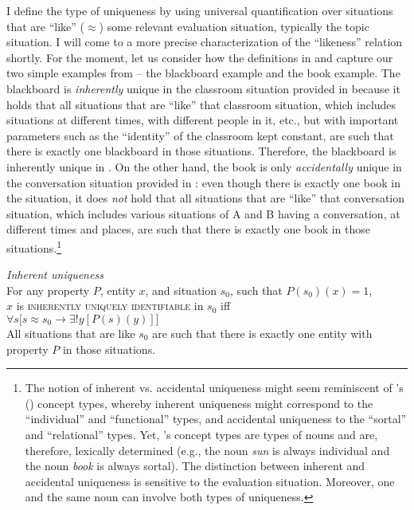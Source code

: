 \documentclass[output=paper,colorlinks,citecolor=brown,newtxmath]{langscibook}
\begin{document}
I define the type of uniqueness by using universal quantification over situations that are ``like'' ($\approx$) some relevant evaluation situation, typically the topic situation. I will come to a more precise characterization of the ``likeness'' relation shortly. For the moment, let us consider how the definitions in  and  capture our two simple examples from  -- the blackboard example and the book example. The blackboard is \textit{inherently} unique in the classroom situation provided in  because it holds that all situations that are ``like'' that classroom situation, which includes situations at different times, with different people in it, etc., but with important parameters such as the ``identity'' of the classroom kept constant, are such that there is exactly one blackboard in those situations. Therefore, the blackboard is inherently unique in . On the other hand, the book is only \textit{accidentally} unique in the conversation situation provided in : even though there is exactly one book in the situation, it does \textit{not} hold that all situations that are ``like'' that conversation situation, which includes various situations of A and B having a conversation, at different times and places, are such that there is exactly one book in those situations.\footnote{The notion of inherent vs. accidental uniqueness might seem reminiscent of \citeauthor{Lobner1985}'s (\citeyear{Lobner1985,Lobner2011}) concept types, whereby inherent uniqueness might correspond to the ``individual'' and ``functional'' types, and accidental uniqueness to the ``sortal'' and ``relational'' types. Yet, \citeauthor{Lobner1985}'s concept types are types of nouns and are, therefore, lexically determined (e.g., the noun \textit{sun} is always individual and the noun \textit{book} is always sortal). The distinction between inherent and accidental uniqueness is sensitive to the evaluation situation. Moreover, one and the same noun can involve both types of uniqueness.}

\ea \textit{Inherent uniqueness}\label{simik:def:inh-uniq}\\
For any property $P$, entity $x$, and situation $s_0$, such that $P(s_0)(x)=1$,\\
$x$ is \textsc{inherently uniquely identifiable} in $s_0$ iff\\
$\forall s\big[s\approx s_0\rightarrow\exists!y[P(s)(y)]\big]$\\
All situations that are like $s_0$ are such that there is exactly one entity with property $P$ in those situations.
\z
\end{document}
